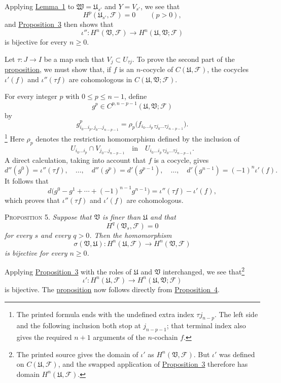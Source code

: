 Applying \hyperref[fac:I:4:no:29:lemma:1]{Lemma~1} to $\mathfrak{W}=\mathfrak{U}_{s'}$ and $Y=V_{s'}$, we see that
\[
H^p(\mathfrak{U}_{s'},\mathcal{F})=0
\qquad(p>0),
\]
and \hyperref[fac:I:4:no:29:prop:3]{Proposition~3} then shows that
\[
\iota'':H^n(\mathfrak{V},\mathcal{F})
\longrightarrow H^n(\mathfrak{U},\mathfrak{V};\mathcal{F})
\]
is bijective for every $n\geq0$.

Let $\tau:J\to I$ be a map such that $V_j\subset U_{\tau j}$. To prove the second part of the \hyperref[fac:I:4:no:29:prop:4]{proposition}, we must show that, if $f$ is an $n$-cocycle of $C(\mathfrak{U},\mathcal{F})$, the cocycles $\iota'(f)$ and $\iota''(\tau f)$ are cohomologous in $C(\mathfrak{U},\mathfrak{V};\mathcal{F})$.

For every integer $p$ with $0\leq p\leq n-1$, define
\[
g^p\in C^{p,n-p-1}(\mathfrak{U},\mathfrak{V};\mathcal{F})
\]
by
\[
g^p_{i_0\ldots i_p,j_0\ldots j_{n-p-1}}
=\rho_p\bigl(f_{i_0\ldots i_p\,\tau j_0\ldots\tau j_{n-p-1}}\bigr).
\]
\footnote{The printed formula ends with the undefined extra index $\tau j_{n-p}$. The left side and the following inclusion both stop at $j_{n-p-1}$; that terminal index also gives the required $n+1$ arguments of the $n$-cochain $f$.}
Here $\rho_p$ denotes the restriction homomorphism defined by the inclusion of
\[
U_{i_0\ldots i_p}\cap V_{j_0\ldots j_{n-p-1}}
\quad\text{in}\quad
U_{i_0\ldots i_p\,\tau j_0\ldots\tau j_{n-p-1}}.
\]
A direct calculation, taking into account that $f$ is a cocycle, gives
\[
d''(g^0)=\iota''(\tau f),\quad\ldots,\quad
d''(g^p)=d'(g^{p-1}),\quad\ldots,\quad
d'(g^{n-1})=(-1)^n\iota'(f).
\]
It follows that
\[
d\bigl(g^0-g^1+\cdots+(-1)^{n-1}g^{n-1}\bigr)
=\iota''(\tau f)-\iota'(f),
\]
which proves that $\iota''(\tau f)$ and $\iota'(f)$ are cohomologous.

\label{fac:I:4:no:29:prop:5}
\textsc{Proposition 5.} \textit{Suppose that $\mathfrak{V}$ is finer than $\mathfrak{U}$ and that}
\[
H^q(\mathfrak{V}_s,\mathcal{F})=0
\]
\textit{for every $s$ and every $q>0$. Then the homomorphism}
\[
\sigma(\mathfrak{V},\mathfrak{U}):
H^n(\mathfrak{U},\mathcal{F})
\longrightarrow H^n(\mathfrak{V},\mathcal{F})
\]
\textit{is bijective for every $n\geq0$.}

Applying \hyperref[fac:I:4:no:29:prop:3]{Proposition~3} with the roles of $\mathfrak{U}$ and $\mathfrak{V}$ interchanged, we see that\footnote{The printed source gives the domain of $\iota'$ as $H^n(\mathfrak V,\mathcal F)$. But $\iota'$ was defined on $C(\mathfrak U,\mathcal F)$, and the swapped application of \hyperref[fac:I:4:no:29:prop:3]{Proposition~3} therefore has domain $H^n(\mathfrak U,\mathcal F)$.}
\[
\iota':H^n(\mathfrak{U},\mathcal{F})
\longrightarrow H^n(\mathfrak{U},\mathfrak{V};\mathcal{F})
\]
is bijective. The \hyperref[fac:I:4:no:29:prop:5]{proposition} now follows directly from \hyperref[fac:I:4:no:29:prop:4]{Proposition~4}.

